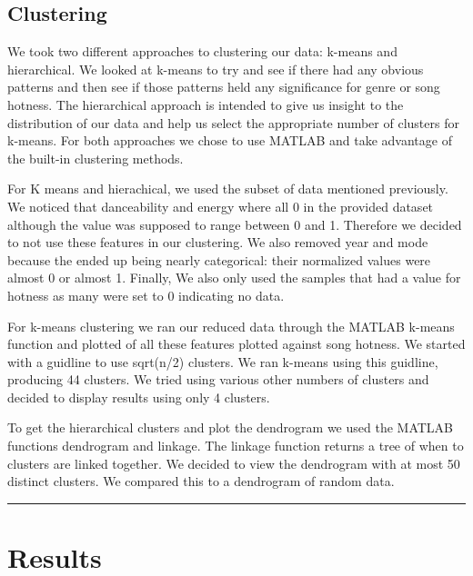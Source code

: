 \documentclass[12pt]{article}
\newcommand{\horizontalLine}{
	\begin{center}
		\hrule width 1.0\textwidth
	\end{center}
}
\begin{document}
\subsection{Clustering}
\label{subsec:clustering}
We took two different approaches to clustering our data: k-means and hierarchical. We looked at k-means to try and see if there had any obvious patterns and then see if those patterns held any significance for genre or song hotness. The hierarchical approach is intended to give us insight to the distribution of our data and help us select the appropriate number of clusters for k-means. For both approaches we chose to use MATLAB and take advantage of the built-in clustering methods.

For K means and hierachical, we used the subset of data mentioned previously. We noticed that danceability and energy where all 0 in the provided dataset although the value was supposed to range between 0 and 1. Therefore we decided to not use these features in our clustering. We also removed year and mode because the ended up being nearly categorical: their normalized values were almost 0 or almost 1. Finally, We also only used the samples that had a value for hotness as many were set to 0 indicating no data. 

For k-means clustering we ran our reduced data through the MATLAB k-means function and plotted of all these features plotted against song hotness. We started with a guidline to use sqrt(n/2) clusters. We ran k-means using this guidline, producing 44 clusters. We tried using various other numbers of clusters and decided to display results using only 4 clusters.

To get the hierarchical clusters and plot the dendrogram we used the MATLAB functions dendrogram and linkage. The linkage function returns a tree of when to clusters are linked together. We decided to view the dendrogram with at most 50 distinct clusters. We compared this to a dendrogram of random data.

\horizontalLine
\section{Results}
\label{sec:results}

\end{document}

